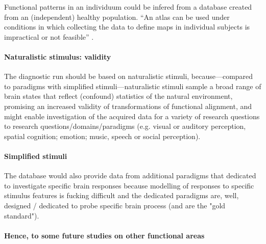 %
Functional patterns in an individuum could be infered from a database created
from an (independent) healthy population.
%
``An atlas can be used under conditions in which collecting the data to define
maps in individual subjects is impractical or not feasible''
\citep{wang2015probabilistic}.


\paragraph{Naturalistic stimulus: validity}

The diagnostic run should be based on naturalistic stimuli, because---compared
to paradigms with simplified stimuli---naturalistic stimuli sample a broad range
of brain states \citep{guntupalli2016model, haxby2011common} that reflect
(confound) statistics of the natural environment, promising an increased
validity of transformations of functional alignment, and might enable
investigation of the acquired data for a variety of research questions to
research questions/domains/paradigms (e.g. visual or auditory perception,
spatial cognition; emotion; music, speech or social perception).



\paragraph{Simplified stimuli}

The database would also provide data from additional paradigms that dedicated to
investigate specific brain responses
%
because modelling of responses to specific stimulus features is fucking
difficult and the dedicated paradigms are, well, designed / dedicated to
probe specific brain process (and are the "gold standard").

\paragraph{Hence, to some future studies on other functional areas}





